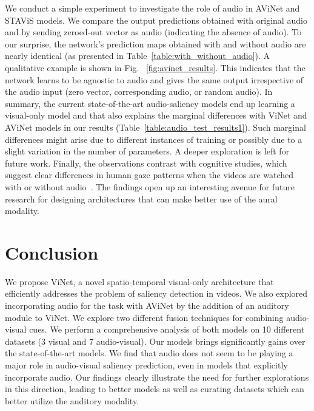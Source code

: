 \documentclass[letterpaper, 10 pt, conference]{ieeeconf}  \usepackage{times}
\begin{document}
We conduct a simple experiment to investigate the role of audio in AViNet and STAViS models. We compare the output predictions obtained with original audio and by sending zeroed-out vector as audio (indicating the absence of audio). To our surprise, the network's prediction maps obtained with and without audio are nearly identical (as presented in Table~\ref{table:with_without_audio}). A qualitative example is shown in Fig. ~\ref{fig:avinet_results}. This indicates that the network learns to be agnostic to audio and gives the same output irrespective of the audio input (zero vector, corresponding audio, or random audio). In summary, the current state-of-the-art audio-saliency models end up learning a visual-only model and that also explains the marginal differences with ViNet and AViNet models in our results (Table~\ref{table:audio_test_results1}). Such marginal differences might arise due to different instances of training or possibly due to a slight variation in the number of parameters. A deeper exploration is left for future work. Finally, the observations contrast with cognitive studies, which suggest clear differences in human gaze patterns when the videos are watched with or without audio~\cite{coutrot2012influence}. The findings open up an interesting avenue for future research for designing architectures that can make better use of the aural modality. 























\section{Conclusion}
We propose ViNet, a novel spatio-temporal visual-only architecture that efficiently addresses the problem of saliency detection in videos. We also explored incorporating audio for the task with AViNet by the addition of an auditory module to ViNet. We explore two different fusion techniques for combining audio-visual cues. We perform a comprehensive analysis of both models on 10 different datasets (3 visual and 7 audio-visual). Our models brings significantly gains over the state-of-the-art models. We find that audio does not seem to be playing a major role in audio-visual saliency prediction, even in models that explicitly incorporate audio. Our findings clearly illustrate the need for further explorations in this direction, leading to better models as well as curating datasets which can better utilize the auditory modality. 
\end{document}

